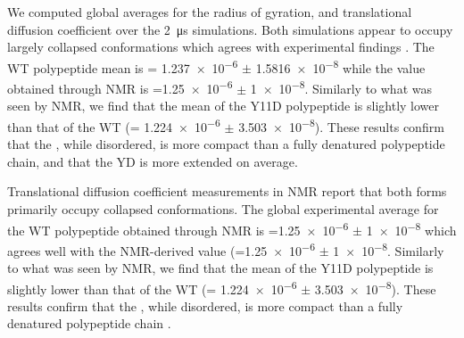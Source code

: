 We computed global averages for the radius of gyration, and translational diffusion coefficient over the \SI{2}{\us} simulations. Both simulations appear to occupy largely collapsed conformations which agrees with experimental findings . The WT polypeptide \diffusion mean is \diffusion = \num{1.237e-6} $\pm$ \SI{1.5816e-8}{\dcunits} while the value obtained through NMR is  \diffusion=\num{1.25e-6} $\pm$  \SI{1e-8}{\dcunits}. Similarly to what was seen by NMR, we find that the mean \diffusion of the Y11D \gct polypeptide is slightly lower than that of the WT \gct (\diffusion= \num{1.224e-6} $\pm$ \SI{3.503e-8}{\dcunits}). These results confirm that the \gct, while disordered, is more compact than a fully denatured polypeptide chain, and that the YD \gct is more extended on average.




\begin{figure}
	\centering     %
	\label{fig:fm}
\end{figure}

Translational diffusion coefficient measurements in NMR report that both \gct forms primarily occupy collapsed conformations. The global experimental average for the WT polypeptide obtained through NMR is \diffusion=\num{1.25e-6} $\pm$  \SI{1e-8}{\dcunits} which agrees well with the NMR-derived value (\diffusion=\num{1.25e-6} $\pm$  \SI{1e-8}{\dcunits}. Similarly to what was seen by NMR, we find that the mean \diffusion of the Y11D \gct polypeptide is slightly lower than that of the WT \gct (\diffusion= \num{1.224e-6} $\pm$ \SI{3.503e-8}{\dcunits}). These results confirm that the \gct, while disordered, is more compact than a fully denatured polypeptide chain . 

